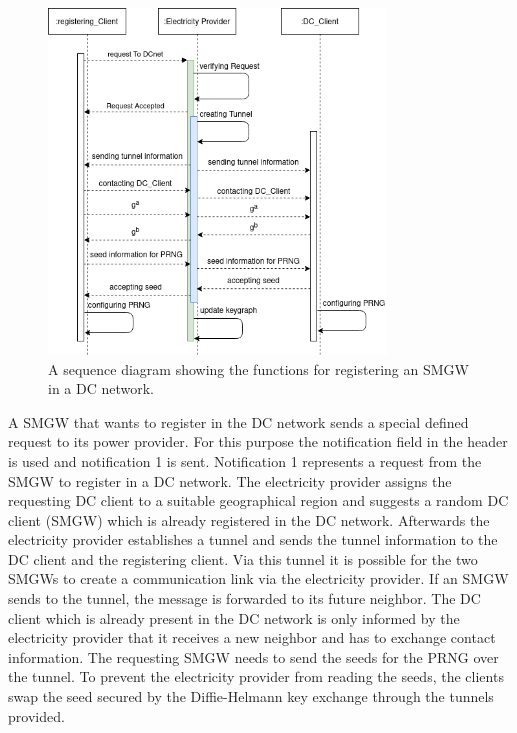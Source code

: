 \begin{figure}[tbp]
  \centering
  \includegraphics[width=0.8\textwidth]{images/Registering2.png}
  \caption[Sequence Diagram Registering]{
A sequence diagram showing the functions for registering an SMGW in a DC network.}
  \label{fig:sequencediagramregistering}
\end{figure}
A \gls{SMGW} that wants to register in the DC network sends a special defined request to its power provider. For this purpose the notification field in the header is used and notification 1 is sent. Notification 1 represents a request from the \gls{SMGW} to register in a DC network. The electricity provider assigns the requesting DC client to a suitable geographical region and suggests a random DC client (\gls{SMGW}) which is already registered in the DC network. Afterwards the electricity provider establishes a tunnel and sends the tunnel information to the DC client and the registering client. Via this tunnel it is possible for the two \gls{SMGW}s to create a communication link via the electricity provider. If an \gls{SMGW} sends to the tunnel, the message is forwarded to its future neighbor. The DC client which is already present in the DC network is only informed by the electricity provider that it receives a new neighbor and has to exchange contact information. The requesting \gls{SMGW} needs to send the seeds for the PRNG over the tunnel. To prevent the electricity provider from reading the seeds, the clients swap the seed secured by the Diffie-Helmann key exchange through the tunnels provided.\\%

